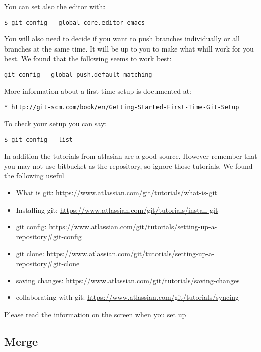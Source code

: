 You can set also the editor with:

\begin{verbatim}
$ git config --global core.editor emacs
\end{verbatim}

You will also need to decide if you want to push branches individually
or all branches at the same time. It will be up to you to make what
whill work for you best. We found that the following seems to work best:

\begin{verbatim}
git config --global push.default matching
\end{verbatim}

More information about a first time setup is documented at:

\begin{verbatim}
* http://git-scm.com/book/en/Getting-Started-First-Time-Git-Setup
\end{verbatim}

To check your setup you can say:

\begin{verbatim}
$ git config --list
\end{verbatim}

In addition the tutorials from atlasian are a good source. However
remember that you may not use bitbucket as the repository, so ignore
those tutorials. We found the following useful

\begin{itemize}
\tightlist
\item
  What is git: \url{https://www.atlassian.com/git/tutorials/what-is-git}
\item
  Installing git:
  \url{https://www.atlassian.com/git/tutorials/install-git}
\item
  git config:
  \url{https://www.atlassian.com/git/tutorials/setting-up-a-repository\#git-config}
\item
  git clone:
  \url{https://www.atlassian.com/git/tutorials/setting-up-a-repository\#git-clone}
\item
  saving changes:
  \url{https://www.atlassian.com/git/tutorials/saving-changes}
\item
  collaborating with git:
  \url{https://www.atlassian.com/git/tutorials/syncing}
\end{itemize}

Please read the information on the screen when you set up

\subsection{Merge}\label{merge}

